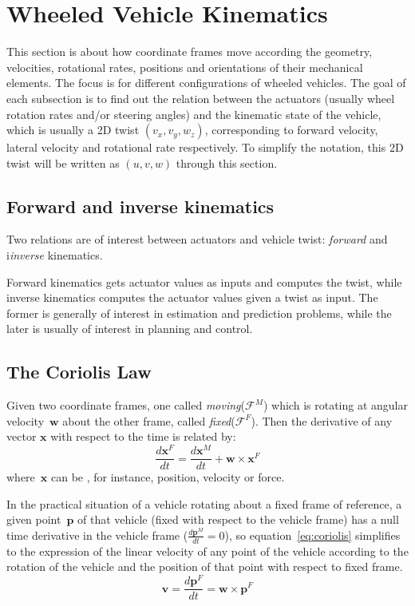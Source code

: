 \section{Wheeled Vehicle Kinematics}
This section is about how coordinate frames move according the geometry, velocities, rotational rates, positions and orientations of their mechanical elements. The focus is for different configurations of wheeled vehicles. The goal of each subsection is to find out the relation between the actuators (usually wheel rotation rates and/or steering angles) and the kinematic state of the vehicle, which is usually a 2D twist $(v_x, v_y, w_z)$, corresponding to forward velocity, lateral velocity and rotational rate respectively. To simplify the notation, this 2D twist will be written as $(u, v, w)$ through this section. 

\subsection{Forward and inverse kinematics}
Two relations are of interest between actuators and vehicle twist: \textit{forward} and i\textit{inverse} kinematics. 

Forward kinematics gets actuator values as inputs and computes the twist, while inverse kinematics computes the actuator values given a twist as input. The former is generally of interest in estimation and prediction problems, while the later is usually of interest in planning and control. 

\subsection{The Coriolis Law}
Given two coordinate frames, one called \textit{moving}($\mathcal{F}^M$) which is rotating at angular velocity~$\mathbf{w}$ about the other frame, called \textit{fixed}($\mathcal{F}^F$). Then the derivative of any vector $\mathbf{x}$ with respect to the time is related by: 
\begin{equation}
\label{eq:coriolis}
 \frac{d\mathbf{x}^F}{dt} = \frac{d\mathbf{x}^M}{dt} + \mathbf{w} \times  \mathbf{x}^F
\end{equation}
where~$\mathbf{x}$ can be , for instance, position, velocity or force. 

In the practical situation of a vehicle rotating about a fixed frame of reference, a given point~$\mathbf{p}$ of that vehicle (fixed with respect to the vehicle frame) has a null time derivative in the vehicle frame ($\frac{d\mathbf{p}^M}{dt} = 0$), so equation~\ref{eq:coriolis} simplifies to the expression of the linear velocity of any point of the vehicle according to the rotation of the vehicle and the position of that point with respect to fixed frame.
\begin{equation}
 \mathbf{v} = \frac{d\mathbf{p}^F}{dt} = \mathbf{w} \times \mathbf{p}^F
\end{equation}


